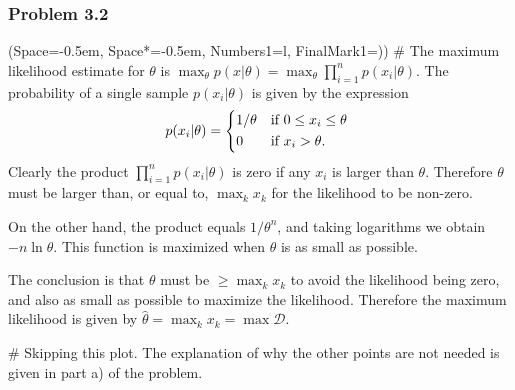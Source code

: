 \documentclass[12pt, a4paper]{article}
\newcommand{\listSpace}{-0.5em}%
\newcommand{\D}{\mathcal{D}}
\begin{document}
\subsubsection*{Problem 3.2}
\begin{easylist}[enumerate]
\ListProperties(Space=\listSpace, Space*=\listSpace, Numbers1=l, FinalMark1={)})
# The maximum likelihood estimate for $\theta$ is $\max_\theta p(x | \theta) = \max_\theta \prod_{i=1}^{n} p(x_i | \theta)$.
The probability of a single sample $p(x_i | \theta)$ is given by the expression
\begin{equation*}
	p(x_i | \theta) = 
	\begin{dcases*}
	1/\theta & if $0 \leq x_i \leq \theta$ \\
	0 & if $ x_i > \theta$.
	\end{dcases*}
\end{equation*}
Clearly the product $\prod_{i=1}^{n} p(x_i | \theta)$ is zero if any $x_i$ is larger than $\theta$.
Therefore $\theta$ must be larger than, or equal to, $\max_k x_k$ for the likelihood to be non-zero.

On the other hand, the product equals $1 /\theta^n$, and taking logarithms we obtain $-n \ln \theta$.
This function is maximized when $\theta$ is as small as possible.

The conclusion is that $\theta$ must be $\geq \max_k x_k$ to avoid the likelihood being zero, and also as small as possible to maximize the likelihood.
Therefore the maximum likelihood is given by $\hat{\theta} = \max_k x_k = \max \D$.

# Skipping this plot. The explanation of why the other points are not needed is given in part a) of the problem.
\end{easylist}
\end{document}
